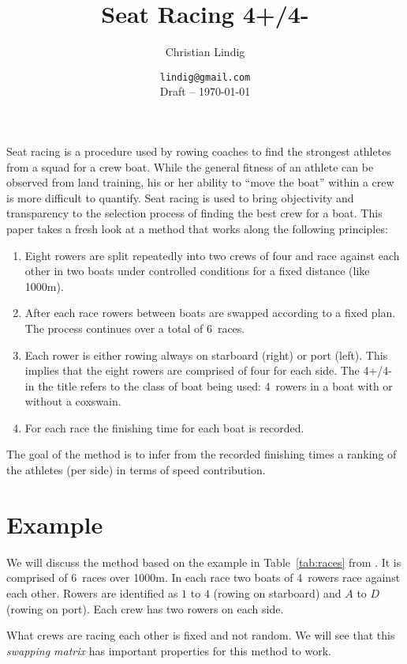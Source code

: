 \documentclass[a4paper,11pt]{article}
\title{Seat Racing 4+/4-}
\author{Christian Lindig}
\date{\texttt{lindig@gmail.com}\\[2ex] Draft -- \today}
\begin{document}
\maketitle

\noindent Seat racing is a procedure used by rowing coaches to find the
strongest athletes from a squad for a crew boat. While the general
fitness of an athlete can be observed from land training, his or her
ability to ``move the boat'' within a crew is more difficult to
quantify. Seat racing is used to bring objectivity and transparency to
the selection process of finding the best crew for a boat. This paper
takes a fresh look at a method that works along the following
principles:

\begin{enumerate}
  \item Eight rowers are split repeatedly into two crews of four and
  race against each other in two boats under controlled conditions for a
  fixed distance (like 1000m).  
  
  \item After each race rowers between boats are swapped according to a
  fixed plan.  The process continues over a total of 6~races.

  \item Each rower is either rowing always on starboard (right) or port
  (left). This implies that the eight rowers are comprised of four for
  each side. The 4+/4- in the title refers to the class of boat being
  used: 4~rowers in a boat with or without a coxswain.

\item For each race the finishing time for each boat is recorded. \end{enumerate}

The goal of the method is to infer from the recorded finishing times a
ranking of the athletes (per side) in terms of speed contribution.

\section{Example}

We will discuss the method based on the example in
Table~\ref{tab:races} from \cite{purcer:dataset}. It is comprised of
6~races over 1000m. In each race two boats of 4~rowers race against each
other. Rowers are identified as $1$ to $4$ (rowing on starboard) and
$A$ to $D$ (rowing on port). Each crew has two rowers on each side.

What crews are racing each other is fixed and not random. We will see
that this \emph{swapping matrix} has important properties for this
method to work.
\end{document}
